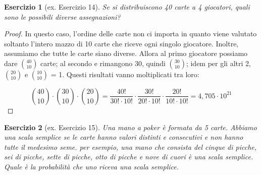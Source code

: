 \documentclass[12pt]{article}
\newtheorem{theorem}{Esercizio}
\begin{document}
\begin{theorem}[ex. Esercizio 14]
	Se si distribuiscono 40 carte a 4 giocatori, quali sono le possibili diverse assegnazioni?
\end{theorem}

\begin{proof}
	In questo caso, l'ordine delle carte non ci importa in quanto viene valutato soltanto l'intero mazzo di 10 carte che riceve ogni singolo giocatore. Inoltre, assumiamo che tutte le carte siano diverse. Allora al primo giocatore possiamo dare $\binom{40}{10}$ carte; al secondo  e rimangono 30, quindi $\binom{30}{10}$; idem per gli altri 2, $\binom{20}{10}$ e $\binom{10}{10}$ = 1. Questi risultati vanno moltiplicati tra loro:
	
	\[
		\binom{40}{10} \cdot \binom{30}{10} \cdot \binom{20}{10} =
		\frac{40!}{30! \cdot 10!} \cdot \frac{30!}{20! \cdot 10!} \cdot \frac{20!}{10! \cdot 10!} = 4,705 \cdot 10^{21}
    \]
	
\end{proof}

\begin{theorem}[ex. Esercizio 15]
	Una mano a poker è formata da 5 carte. Abbiamo una scala semplice se le carte hanno valori distinti e consecutivi e non hanno tutte il medesimo seme. per esempio, una mano che consista del cinque di picche, sei di picche, sette di picche, otto di picche e nove di cuori è una scala semplice. Quale è la probabilità che uno riceva una scala semplice.
\end{theorem}
\end{document}
